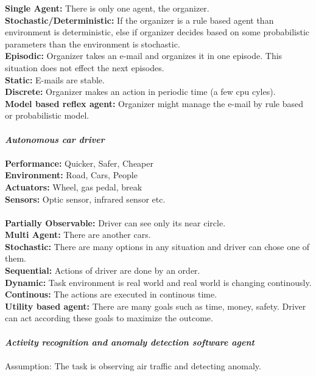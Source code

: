 \documentclass[a4paper,11pt]{report}
\begin{document}
\textbf{Single Agent:} There is only one agent, the organizer.\\
\textbf{Stochastic/Deterministic:} If the organizer is a rule based agent than environment is deterministic, else if organizer decides based on some probabilistic parameters than the environment is stochastic.\\
\textbf{Episodic:} Organizer takes an e-mail and organizes it in one episode. This situation does not effect the next episodes.\\
\textbf{Static:} E-mails are stable.\\
\textbf{Discrete:} Organizer makes an action in periodic time (a few cpu cyles). \\
\textbf{Model based reflex agent:} Organizer might manage the e-mail by rule based or probabilistic model.\\
\\
\emph{\textbf{Autonomous car driver}}\\
\\
\textbf{Performance:} Quicker, Safer, Cheaper\\
\textbf{Environment:} Road, Cars, People\\
\textbf{Actuators:} Wheel, gas pedal, break\\
\textbf{Sensors:} Optic sensor, infrared sensor etc.\\
\\
\textbf{Partially Observable:} Driver can see only its near circle.\\
\textbf{Multi Agent:} There are another cars.\\
\textbf{Stochastic:} There are many options in any situation and driver can chose one of them.\\
\textbf{Sequential:} Actions of driver are done by an order.\\
\textbf{Dynamic:} Task environment is real world and real world is changing continously.\\
\textbf{Continous:} The actions are executed in continous time. \\
\textbf{Utility based agent:} There are many goals such as time, money, safety. Driver can act according these goals to maximize the outcome.\\
\\
\emph{\textbf{Activity recognition and anomaly detection software agent}}\\
\\
Assumption: The task is observing air traffic and detecting anomaly.\\
\end{document}
